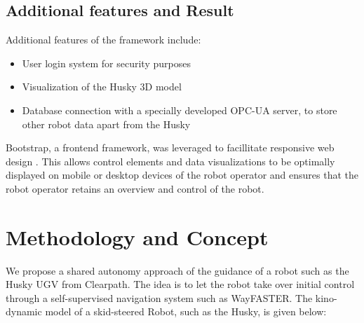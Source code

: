 \documentclass[letterpaper, 10 pt, conference]{ieeeconf}  %
\begin{document}
\subsection{Additional features and Result}
Additional features of the framework include: 
\begin{itemize}
\item User login system for security purposes
\item Visualization of the Husky 3D model 
\item Database connection with a specially developed OPC-UA server, to store other robot data apart from the Husky
\end{itemize}
Bootstrap, a frontend framework, was leveraged to facillitate responsive web design \cite{bootstrap}. 
This allows control elements and data visualizations to be optimally displayed on mobile or desktop devices of the robot operator and ensures that the robot operator retains an overview and control of the robot.










\section{Methodology and Concept}
We propose a shared autonomy approach of the guidance of a robot such as the Husky UGV from Clearpath. 
The idea is to let the robot take over initial control through a self-supervised navigation system such as WayFASTER.
The kino-dynamic model of a skid-steered Robot, such as the Husky, is given below: \cite{wayfaster}

\vspace{-0.1in}

\end{document}
